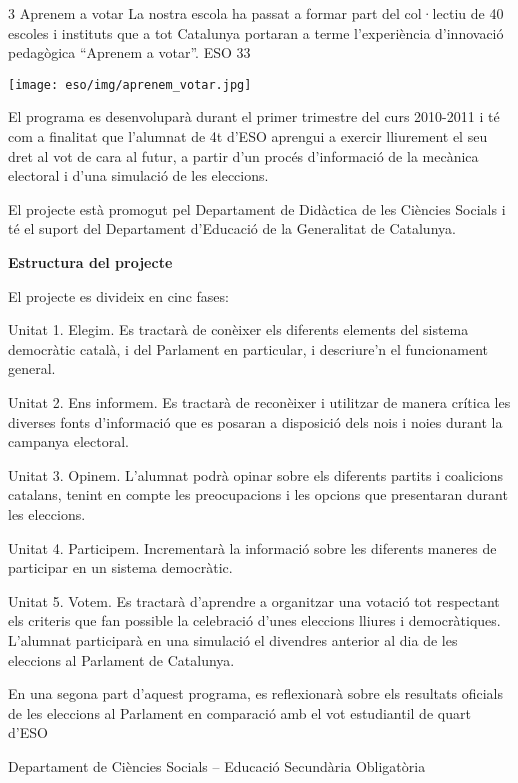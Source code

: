 \begin{news}
{3} %
{Aprenem a votar}
{La nostra escola ha passat a formar part del col·lectiu de 40 escoles i instituts que a tot Catalunya portaran a terme l’experiència d’innovació pedagògica “Aprenem a votar”. 
}
{ESO}
{33} %

\noindent\texttt{[image: eso/img/aprenem\_votar.jpg]}

El programa es desenvoluparà durant el primer trimestre del curs 2010-2011 i té com a finalitat que l’alumnat de 4t d’ESO aprengui a exercir lliurement el seu dret al vot de cara al futur, a partir d’un procés d’informació de la mecànica electoral i d’una simulació de les eleccions.

El projecte està promogut pel Departament de Didàctica de les Ciències Socials i té el suport del Departament d’Educació de la Generalitat de Catalunya.


\bf Estructura del projecte  

\rm
El projecte es divideix en cinc fases:

Unitat 1. Elegim. Es tractarà de conèixer els diferents elements del sistema democràtic català, i del Parlament en particular, i descriure’n el funcionament general.

Unitat 2. Ens informem. Es tractarà de reconèixer i utilitzar de manera crítica les diverses fonts d’informació que es posaran a disposició dels nois i noies durant la campanya electoral.

Unitat 3. Opinem.  L’alumnat podrà opinar sobre els diferents partits i coalicions catalans, tenint en compte les preocupacions i les opcions que presentaran durant les eleccions.

Unitat 4. Participem. Incrementarà la informació sobre les diferents maneres de participar en un sistema democràtic.


Unitat 5. Votem. Es tractarà d’aprendre a organitzar una votació tot respectant els criteris que fan possible la celebració d’unes eleccions lliures i democràtiques. L’alumnat participarà en una simulació el divendres anterior al dia de les eleccions al Parlament de Catalunya. 


En una segona part d’aquest programa, es reflexionarà sobre els resultats oficials de les eleccions al Parlament en comparació amb el vot estudiantil de quart d’ESO

Departament de Ciències Socials – Educació Secundària Obligatòria

\end{news}
